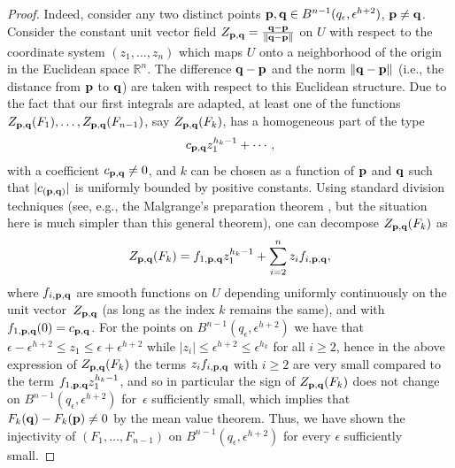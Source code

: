 \begin{proof}
Indeed, consider any two distinct points ${\bf p},{\bf q} \in B^{n-1}(q_\epsilon, \epsilon^{h+2})$, ${\bf p} \neq {\bf q}$.
Consider the constant unit vector f\/ield $Z_{{\bf p},{\bf q}} = \frac{{\bf q} - {\bf p}}{\|{\bf q} - {\bf p} \|}$
on $U$ with respect to the coordinate system $(z_1,\dots, z_n)$ which maps
$U$ onto a neighborhood of the origin in the Euclidean space $\mathbb{R}^n$.
The dif\/ference ${\bf q} - {\bf p}$ and the norm $\|{\bf q} - {\bf p} \|$
(i.e., the distance from ${\bf p}$ to ${\bf q}$) are taken with respect
to this Euclidean structure. Due to the fact that our
f\/irst integrals are adapted, at least one of the functions
$Z_{{\bf p},{\bf q}}(F_1), \dots, Z_{{\bf p},{\bf q}}(F_{n-1})$,
say $Z_{{\bf p},{\bf q}}(F_k)$, has a homogeneous part of the type
\begin{gather*} c_{{\bf p},{\bf q}} z_1^{h_k -1} + \cdots,
\end{gather*}
with a coef\/f\/icient $c_{{\bf p},{\bf q}} \neq 0$, and $k$ can be chosen
as a function of ${\bf p}$ and ${\bf q}$ such that $|c_{({\bf p},{\bf q})}|$
is uniformly bounded by positive constants. Using standard division techniques
(see, e.g., the Malgrange's preparation
theorem \cite{Malgrange-Ideal1967}, but the situation here is much simpler than this general theorem), one can decompose $Z_{{\bf p},{\bf q}}(F_k)$ as
\begin{gather*} Z_{{\bf p},{\bf q}}(F_k) = f_{1, {\bf p},{\bf q}}z_1^{h_k-1}
+ \sum_{i=2}^n z_i f_{i, {\bf p},{\bf q}},\end{gather*}
where $f_{i, {\bf p},{\bf q}}$ are smooth functions on $U$ depending uniformly
continuously on the unit vector~$Z_{{\bf p},{\bf q}}$ (as long as the index $k$ remains the same), and with $f_{1, {\bf p},{\bf q}}(0) = c_{{\bf p},{\bf q}}$.
For the points on $B^{n-1}(q_\epsilon, \epsilon^{h+2})$ we have that
$\epsilon - \epsilon^{h+2} \leq z_1 \leq \epsilon + \epsilon^{h+2}$
while $|z_i| \leq \epsilon^{h+2} \leq \epsilon^{h_k}$ for all $i \geq 2$,
hence in the above expression of $Z_{{\bf p},{\bf q}}(F_k)$ the terms
$z_i f_{i, {\bf p},{\bf q}}$ with $i \geq 2$ are very small compared to the
term $f_{1, {\bf p},{\bf q}}z_1^{h_k-1}$, and so in particular the sign of
$Z_{{\bf p},{\bf q}}(F_k)$ does not change on $B^{n-1}(q_\epsilon, \epsilon^{h+2})$ for~$\epsilon$ suf\/f\/iciently small, which implies that
$F_k({\bf q}) - F_k({\bf p}) \neq 0$ by the mean value theorem. Thus, we have shown the injectivity of $(F_1,\dots, F_{n-1})$ on $B^{n-1}(q_\epsilon, \epsilon^{h+2})$ for every $\epsilon$ suf\/f\/iciently small.


\end{proof}
